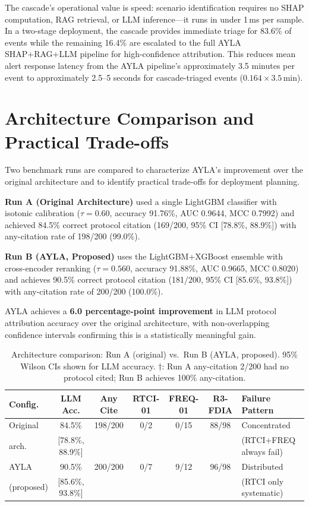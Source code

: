 \documentclass[twocolumn, 10pt, letterpaper]{article}
\begin{document}
The cascade's operational value is speed: scenario identification requires
no SHAP computation, RAG retrieval, or LLM inference---it runs in under 1\,ms
per sample.
In a two-stage deployment, the cascade provides immediate triage for 83.6\% of
events while the remaining 16.4\% are escalated to the full AYLA SHAP+RAG+LLM
pipeline for high-confidence attribution.
This reduces mean alert response latency from the AYLA pipeline's approximately
3.5 minutes per event to approximately 2.5--5 seconds for cascade-triaged events
($0.164 \times 3.5\,\text{min}$).

\section{Architecture Comparison and Practical Trade-offs}
\label{sec:comparison}

Two benchmark runs are compared to characterize AYLA's improvement over the
original architecture and to identify practical trade-offs for deployment planning.

\textbf{Run A (Original Architecture)} used a single LightGBM classifier with
isotonic calibration ($\tau{=}0.60$, accuracy 91.76\%, AUC 0.9644, MCC 0.7992)
and achieved 84.5\% correct protocol citation (169/200, 95\% CI [78.8\%, 88.9\%])
with any-citation rate of 198/200 (99.0\%).

\textbf{Run B (AYLA, Proposed)} uses the LightGBM+XGBoost ensemble with
cross-encoder reranking ($\tau{=}0.560$, accuracy 91.88\%, AUC 0.9665,
MCC 0.8020) and achieves 90.5\% correct protocol citation (181/200,
95\% CI [85.6\%, 93.8\%]) with any-citation rate of 200/200 (100.0\%).

AYLA achieves a \textbf{6.0 percentage-point improvement} in LLM protocol
attribution accuracy over the original architecture, with non-overlapping
confidence intervals confirming this is a statistically meaningful gain.

\begin{table}[t]
\centering
\caption{Architecture comparison: Run A (original) vs.\ Run B (AYLA, proposed).
         95\% Wilson CIs shown for LLM accuracy. $\dagger$: Run A any-citation
         2/200 had no protocol cited; Run B achieves 100\% any-citation.}
\label{tab:arch_compare}
\small
\begin{tabular}{lcccccp{3.2cm}}
\toprule
\textbf{Config.} & \textbf{LLM Acc.} & \textbf{Any Cite} & \textbf{RTCI-01} & \textbf{FREQ-01} & \textbf{R3-FDIA} & \textbf{Failure Pattern} \\
\midrule
Original & 84.5\% & 198/200 & 0/2 & 0/15 & 88/98 & Concentrated \\
arch.    & [78.8\%, 88.9\%] & & & & & (RTCI+FREQ always fail) \\[4pt]
AYLA & 90.5\% & 200/200 & 0/7 & 9/12 & 96/98 & Distributed \\
(proposed) & [85.6\%, 93.8\%] & & & & & (RTCI only systematic) \\
\bottomrule
\end{tabular}
\end{table}
\end{document}
